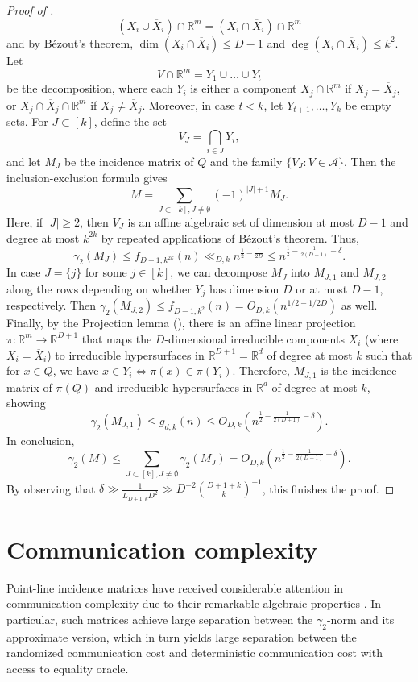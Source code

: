 \documentclass[11pt]{article}
\theoremstyle{plain}
\theoremstyle{definition}
\begin{document}
\begin{proof}[Proof of ]
		$$(X_i\cup \overline{X}_i)\cap \mathbb{R}^m=(X_i\cap \overline{X}_i)\cap \mathbb{R}^m$$
		and by B\'ezout's theorem, $\dim(X_i\cap \overline{X}_i)\leq D-1$ and $\deg(X_i\cap \overline{X}_i)\leq k^2$. Let 
		$$V\cap \mathbb{R}^m=Y_1\cup\dots\cup Y_t$$ be the decomposition, where each $Y_i$ is either a component $X_j\cap \mathbb{R}^m$ if $X_j=\overline{X}_j$, or $X_j\cap \overline{X}_j\cap \mathbb{R}^m$ if $X_j\neq \overline{X}_j$. Moreover, in case $t<k$, let $Y_{t+1},\dots,Y_{k}$ be empty sets. For $J\subset [k]$, define the set 
		$$V_J=\bigcap_{i\in J}Y_i,$$
		and let $M_J$ be the incidence matrix of $Q$ and the family $\{V_J: V\in \mathcal{A}\}$. Then the inclusion-exclusion formula gives
		$$M=\sum_{J\subset [k], J\neq \emptyset} (-1)^{|J|+1} M_J.$$
		Here, if $|J|\geq 2$, then $V_J$ is an affine algebraic set of dimension at most $D-1$ and degree at most $k^{2k}$ by repeated applications of B\'ezout's theorem. Thus, 
        $$\gamma_2(M_J)\leq f_{D-1,k^{2k}}(n)\ll_{D,k} n^{\frac{1}{2}-\frac{1}{2D}}\leq  n^{\frac{1}{2}-\frac{1}{2(D+1)}-\delta}.$$ In case $J=\{j\}$ for some $j\in [k]$, we can decompose $M_J$ into $M_{J,1}$ and $M_{J,2}$ along the rows depending on whether $Y_j$ has dimension $D$ or at most $D-1$, respectively. Then $\gamma_2(M_{J,2})\leq f_{D-1,k^2}(n)=O_{D,k}(n^{1/2-1/2D})$ as well. Finally, by the Projection lemma (), there is an affine linear projection $\pi:\mathbb{R}^m\rightarrow\mathbb{R}^{D+1}$ that maps the $D$-dimensional irreducible components $X_i$ (where $X_i=\overline{X}_i$) to irreducible hypersurfaces in $\mathbb{R}^{D+1}=\mathbb{R}^d$ of degree at most $k$ such that for $x\in Q$, we have $x\in Y_i\iff \pi(x)\in \pi(Y_i)$. Therefore, $M_{J,1}$ is the incidence matrix of $\pi(Q)$ and irreducible hypersurfaces in $\mathbb{R}^{d}$ of degree at most $k$, showing $$\gamma_2(M_{J,1})\leq g_{d,k}(n)\leq O_{D,k}\left(n^{\frac{1}{2}-\frac{1}{2(D+1)}-\delta}\right).$$
		In conclusion,
		$$\gamma_2(M)\leq \sum_{J\subset [k], J\neq \emptyset} \gamma_2(M_J)= O_{D,k}\left( n^{\frac{1}{2}-\frac{1}{2(D+1)}-\delta}\right).$$
		By observing that  $\delta\gg \frac{1}{L_{D+1,k} D^{2}}\gg D^{-2}\binom{D+1+k}{k}^{-1}$, this finishes the proof.
	\end{proof}
	
	\section{Communication complexity}\label{sect:comm_compl}
	
	Point-line incidence matrices have received considerable attention in communication complexity due to their remarkable algebraic properties \cite{CHHNPS,GH_totally_real,GHRS}. In particular, such matrices achieve large separation between the $\gamma_2$-norm and its approximate version, which in turn yields large separation between the randomized communication cost and deterministic communication cost with access to equality oracle.
	
\end{document}

